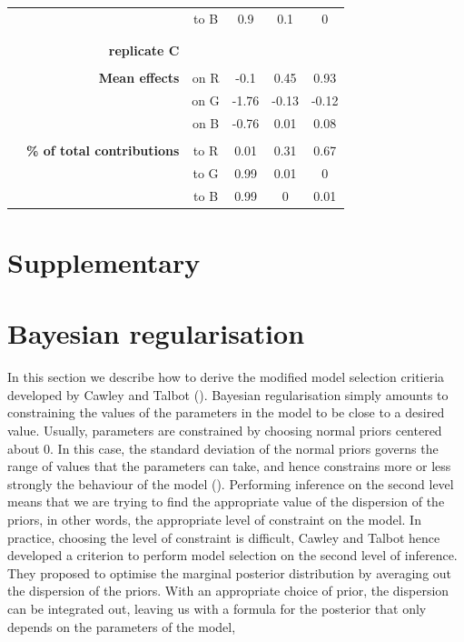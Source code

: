 \documentclass[11pt, oneside]{article}
\newcommand{\beginsupplement}{%
        \setcounter{table}{0}
        \renewcommand{\thetable}{S\arabic{table}}%
        \setcounter{figure}{0}
        \renewcommand{\thefigure}{S\arabic{figure}}%
     }
\begin{document}
\begin{table}[H]
\begin{center}
\begin{tabular}{rrcccc}
    & & to B &  0.9  & 0.1  & 0    \\
	& \\
	\hline
	& \\
	& \textbf{replicate C} \\
	& \\
	& \textbf{Mean effects} 
    &   on R & -0.1  &  0.45 &  0.93 \\
    & & on G & -1.76 & -0.13 & -0.12 \\
    & & on B & -0.76 &  0.01 &  0.08 \\
	& \\
	& \textbf{\% of total contributions} 
	& to R   & 0.01 & 0.31 & 0.67 \\
    & & to G & 0.99 & 0.01 & 0    \\
    & & to B & 0.99 & 0    & 0.01 \\
\end{tabular}
\end{center}
\end{table}
\newpage



\newpage
\section{Supplementary}
\appendix
\beginsupplement

\section{Bayesian regularisation}

In this section we describe how to derive the modified model selection critieria developed by Cawley and Talbot (\cite{Cawley2007}).
Bayesian regularisation simply amounts to constraining the values of the parameters in the model to be close to a desired value. 
Usually, parameters are constrained by choosing normal priors centered about 0.
In this case, the standard deviation of the normal priors governs the range of values that the parameters can take, and hence constrains more or less strongly the behaviour of the model (\cite{Cawley2007}).
Performing inference on the second level means that we are trying to find the appropriate value of the dispersion of the priors, in other words, the appropriate level of constraint on the model. 
In practice, choosing the level of constraint is difficult, Cawley and Talbot hence developed a criterion to perform model selection on the second level of inference.
They proposed to optimise the marginal posterior distribution by averaging out the dispersion of the priors.
With an appropriate choice of prior, the dispersion can be integrated out, leaving us with a formula for the posterior that only depends on the parameters of the model,
\end{document}
